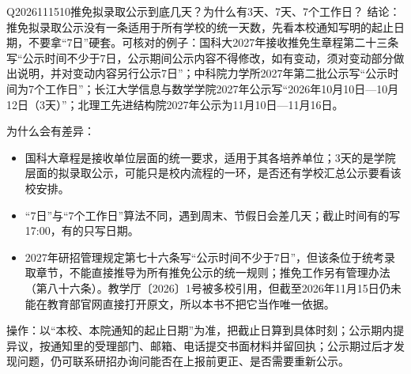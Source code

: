 \begin{qa}{Q2026111510}{推免拟录取公示到底几天？为什么有3天、7天、7个工作日？}
结论：推免拟录取公示没有一条适用于所有学校的统一天数，先看本校通知写明的起止日期，不要拿“7日”硬套。可核对的例子：国科大2027年接收推免生章程第二十三条写“公示时间不少于7日，公示期间公示内容不得修改，如有变动，须对变动部分做出说明，并对变动内容另行公示7日”；中科院力学所2027年第二批公示写“公示时间为7个工作日”；长江大学信息与数学学院2027年公示写“2026年10月10日—10月12日（3天）”；北理工先进结构院2027年公示为11月10日—11月16日。

为什么会有差异：

\begin{itemize}
\item 国科大章程是接收单位层面的统一要求，适用于其各培养单位；3天的是学院层面的拟录取公示，可能只是校内流程的一环，是否还有学校汇总公示要看该校安排。
\item “7日”与“7个工作日”算法不同，遇到周末、节假日会差几天；截止时间有的写17:00，有的只写日期。
\item 2027年研招管理规定第七十六条写“公示时间不少于7日”，但该条位于统考录取章节，不能直接推导为所有推免公示的统一规则；推免工作另有管理办法（第八十六条）。教学厅〔2026〕1号被多校引用，但截至2026年11月15日仍未能在教育部官网直接打开原文，所以本书不把它当作唯一依据。
\end{itemize}

操作：以“本校、本院通知的起止日期”为准，把截止日算到具体时刻；公示期内提异议，按通知里的受理部门、邮箱、电话提交书面材料并留回执；公示期过后才发现问题，仍可联系研招办询问能否在上报前更正、是否需要重新公示。
\end{qa}

